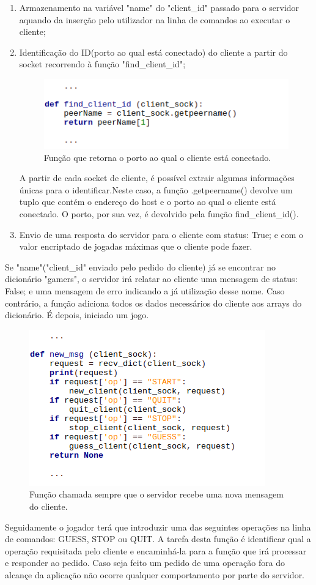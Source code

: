 \documentclass{report}
\begin{document}
\begin{enumerate}
\item Armazenamento na variável "name" do "client\_id" passado para o servidor aquando da inserção pelo utilizador na linha de comandos ao executar o cliente;
\item Identificação do ID(porto ao qual está conectado) do cliente a partir do socket recorrendo à função "find\_client\_id";

\begin{figure}[H]
        \centering
        \includegraphics[scale=0.65]{find_client_id}    
        \caption{Função que retorna o porto ao qual o cliente está conectado.}
\end{figure}
A partir de cada socket de cliente, é possível extrair algumas informações únicas para o identificar.Neste caso, a função .getpeername() devolve um tuplo que contém o endereço do host e o porto ao qual o cliente está conectado. O porto, por sua vez, é devolvido pela função find\_client\_id().
        
\item Envio de uma resposta do servidor para o cliente com status: True; e com o valor encriptado de jogadas máximas que o cliente pode fazer.
\end{enumerate}
Se "name"("client\_id" enviado pelo pedido do cliente) já se encontrar no dicionário "gamers", o servidor irá relatar ao cliente uma mensagem de status: False; e uma mensagem de erro indicando a já utilização desse nome.
Caso contrário, a função adiciona todos os dados necessários do cliente aos arrays do dicionário. É depois, iniciado um jogo.

\begin{figure}[H]
        \centering
        \includegraphics[scale=0.65]{new_msg}   
        \caption{Função chamada sempre que o servidor recebe uma nova mensagem do cliente.}
\end{figure}
Seguidamente o jogador terá que introduzir uma das seguintes operações na linha de comandos: GUESS, STOP ou QUIT.
A tarefa desta função é identificar qual a operação requisitada pelo cliente e encaminhá-la para a função que irá processar e responder ao pedido.
Caso seja feito um pedido de uma operação fora do alcançe da aplicação não ocorre qualquer comportamento por parte do servidor.
\end{document}
